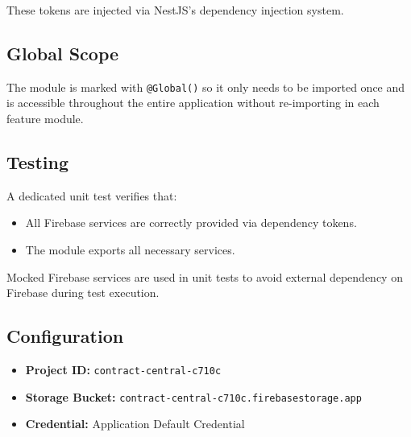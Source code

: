 These tokens are injected via NestJS's dependency injection system.

\subsection*{Global Scope}

The module is marked with \texttt{@Global()} so it only needs to be imported once and is accessible throughout the entire application without re-importing in each feature module.

\subsection*{Testing}

A dedicated unit test verifies that:
\begin{itemize}
    \item All Firebase services are correctly provided via dependency tokens.
    \item The module exports all necessary services.
\end{itemize}

Mocked Firebase services are used in unit tests to avoid external dependency on Firebase during test execution.

\subsection*{Configuration}

\begin{itemize}
    \item \textbf{Project ID:} \texttt{contract-central-c710c}
    \item \textbf{Storage Bucket:} \texttt{contract-central-c710c.firebasestorage.app}
    \item \textbf{Credential:} Application Default Credential
\end{itemize}
